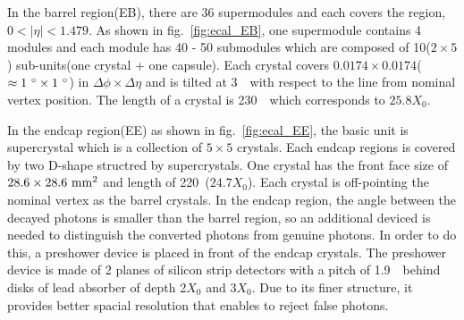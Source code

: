 In the barrel region(EB), there are 36 supermodules and each covers 
the region, $0 < |\eta| < 1.479$. 
As shown in fig.~\ref{fig:ecal_EB}, one supermodule contains 4 modules 
and each module has 40 - 50 submodules 
which are composed of 10($2 \times 5$) sub-units(one crystal + one capsule). 
Each crystal covers $0.0174 \times 0.0174$($\approx 1~^\circ \times 1~^\circ$)
in $\Delta \phi \times \Delta \eta$ and is tilted at 3~\dg\ with respect to the line 
from nominal vertex position. %
The length of a crystal is 230~\mm\ which corresponds to $25.8X_0$.

In the endcap region(EE) as shown in fig.~\ref{fig:ecal_EE}, 
the basic unit is supercrystal which is a collection of $5 \times 5$ crystals. 
Each endcap regions is covered 
by two D-shape structred by supercrystals. 
One crystal has the front face size of $28.6 \times 28.6~\mathrm{mm}^2$ 
and length of 220~\mm($24.7X_0$).
Each crystal is off-pointing the nominal vertex as the barrel crystals.  
In the endcap region, the angle between the decayed photons 
is smaller than the barrel region, so an additional deviced is 
needed to distinguish the converted photons from genuine photons.
In order to do this, a preshower device is placed in front of the endcap crystals. 
The preshower device is made of 2 planes of silicon strip detectors with a pitch of 1.9~\mm\
behind disks of lead absorber of depth 2$X_0$ and 3$X_0$.
Due to its finer structure, it provides better spacial resolution 
that enables to reject false photons.  

